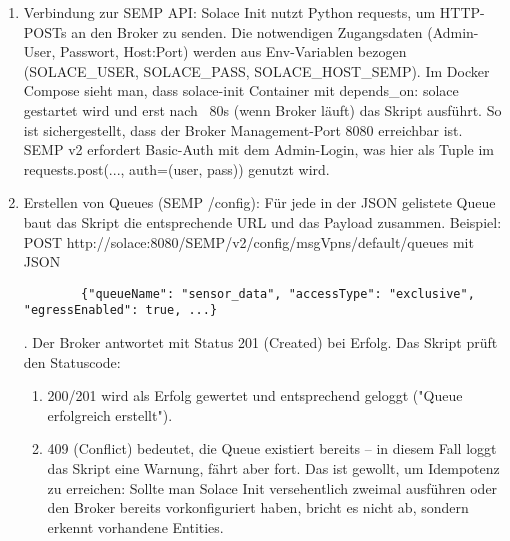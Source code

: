 \begin{enumerate}
\begin{lstlisting}
    {
      "queues": [
        {
          "queueName": "sensor_data",
          "accessType": "exclusive",
          "egressEnabled": true,
          "ingressEnabled": true,
          "subscriptions": [
            { "subscriptionTopic": "sensora/v1/send/>" }
          ]
        },
        {
          "queueName": "sensor_setpoints",
          "accessType": "exclusive",
          "subscriptions": [
            { "subscriptionTopic": "sensora/v1/receive/>" }
          ]
        }
      ]
    }
    \end{lstlisting}
    Hier würde z.B. festgelegt, dass es eine Queue sensor\_data gibt, die exklusiv ist und sowohl Ingress/Egress aktiviert hat (Standard für persistent Queues), und dass sie alle Topics unter sensora/v1/send abonniert (der > Wildcard deckt alle Unterpfade ab). Ebenso eine Queue sensor\_setpoints für alle sensora/v1/receive Nachrichten. Dieses Konstrukt deckt die zuvor diskutierten Pfade ab: Messwerte und Steuerbefehle.
    \item Verbindung zur SEMP API: Solace Init nutzt Python requests, um HTTP-POSTs an den Broker zu senden. Die notwendigen Zugangsdaten (Admin-User, Passwort, Host:Port) werden aus Env-Variablen bezogen (SOLACE\_USER, SOLACE\_PASS, SOLACE\_HOST\_SEMP). Im Docker Compose sieht man, dass solace-init Container mit depends\_on: solace gestartet wird und erst nach ~80s (wenn Broker läuft) das Skript ausführt. So ist sichergestellt, dass der Broker Management-Port 8080 erreichbar ist. SEMP v2 erfordert Basic-Auth mit dem Admin-Login\cite{solaceSEMP}, was hier als Tuple im requests.post(..., auth=(user, pass)) genutzt wird.
    \item Erstellen von Queues (SEMP /config): Für jede in der JSON gelistete Queue baut das Skript die entsprechende URL und das Payload zusammen. Beispiel: POST http://solace:8080/SEMP/v2/config/msgVpns/default/queues mit JSON 
    \begin{lstlisting}
        {"queueName": "sensor_data", "accessType": "exclusive", "egressEnabled": true, ...}
    \end{lstlisting}.
    Der Broker antwortet mit Status 201 (Created) bei Erfolg. Das Skript prüft den Statuscode:
    \begin{enumerate}
        \item 200/201 wird als Erfolg gewertet und entsprechend geloggt ("Queue erfolgreich erstellt").
        \item 409 (Conflict) bedeutet, die Queue existiert bereits – in diesem Fall loggt das Skript eine Warnung, fährt aber fort. Das ist gewollt, um Idempotenz zu erreichen: Sollte man Solace Init versehentlich zweimal ausführen oder den Broker bereits vorkonfiguriert haben, bricht es nicht ab, sondern erkennt vorhandene Entities.

\end{enumerate}
\end{enumerate}
